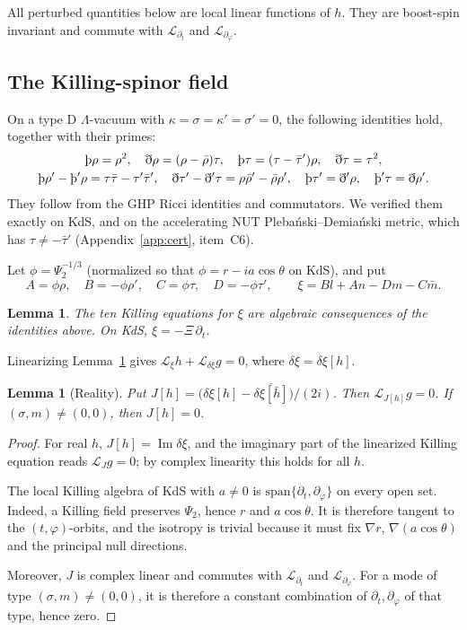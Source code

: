 \documentclass[11pt]{amsart}
\newtheorem{lemma}[theorem]{Lemma}
\theoremstyle{definition}
\theoremstyle{remark}
\numberwithin{equation}{section}
\newcommand{\Th}{\text{\th}}
\newcommand{\cL}{\mathcal{L}}
\renewcommand{\Im}{\operatorname{Im}}
\begin{document}
All perturbed quantities below are local linear functions of $h$. They are boost-spin invariant and commute with
$\cL_{\partial_t}$ and $\cL_{\partial_\varphi}$.

\subsection{The Killing-spinor field}
On a type D $\Lambda$-vacuum with $\kappa=\sigma=\kappa'=\sigma'=0$, the following identities hold, together with
their primes:
\begin{gather*}
\Th\rho=\rho^2,\quad\eth\rho=(\rho-\bar\rho)\tau,\quad\Th\tau=(\tau-\bar\tau')\rho,\quad\eth\tau=\tau^2,\\
\Th\rho'-\Th'\rho=\tau\bar\tau-\tau'\bar\tau',\quad\eth\tau'-\eth'\tau=\rho\bar\rho'-\bar\rho\rho',\quad
\Th\tau'=\eth'\rho,\quad\Th'\tau=\eth\rho'.
\end{gather*}
They follow from the GHP Ricci identities and commutators. We verified them exactly on KdS, and on the accelerating NUT
Pleba\'nski--Demia\'nski metric, which has $\tau\ne-\bar\tau'$ (Appendix~\ref{app:cert}, item~C6).

Let $\phi=\Psi_2^{-1/3}$ (normalized so that $\phi=r-ia\cos\theta$ on KdS), and put
\[
A=\phi\rho,\quad B=-\phi\rho',\quad C=\phi\tau,\quad D=-\phi\tau',\qquad \xi=Bl+An-Dm-C\bar m.
\]

\begin{lemma}\label{lem:xi}
The ten Killing equations for $\xi$ are algebraic consequences of the identities above. On KdS,
$\xi=-\Xi\,\partial_t$.
\end{lemma}

Linearizing Lemma~\ref{lem:xi} gives $\cL_\xi h+\cL_{\delta\xi}g=0$, where $\delta\xi=\delta\xi[h]$.

\begin{lemma}[Reality]\label{lem:reality}
Put $J[h]=\big(\delta\xi[h]-\overline{\delta\xi[\bar h]}\big)/(2i)$. Then $\cL_{J[h]}g=0$. If $(\sigma,m)\ne(0,0)$,
then $J[h]=0$.
\end{lemma}
\begin{proof}
For real $h$, $J[h]=\Im\delta\xi$, and the imaginary part of the linearized Killing equation reads $\cL_Jg=0$;
by complex linearity this holds for all $h$.

The local Killing algebra of KdS with $a\neq0$ is $\mathrm{span}\{\partial_t,\partial_\varphi\}$ on every open set. Indeed,
a Killing field preserves $\Psi_2$, hence $r$ and $a\cos\theta$. It is therefore tangent to the $(t,\varphi)$-orbits,
and the isotropy is trivial because it must fix $\nabla r$, $\nabla(a\cos\theta)$ and the principal null directions.

Moreover, $J$ is complex linear and commutes with $\cL_{\partial_t}$ and $\cL_{\partial_\varphi}$. For a mode of type
$(\sigma,m)\ne(0,0)$, it is therefore a constant combination of $\partial_t,\partial_\varphi$ of that type, hence zero.
\end{proof}
\end{document}
